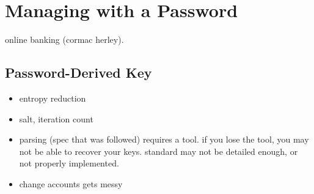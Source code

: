 
\section{Managing with a Password}

\cf online banking (cormac herley).


\subsection{Password-Derived Key} 

\begin{itemize}
  \item entropy reduction
  \item salt, iteration count
  \item parsing (spec that was followed) requires a tool. if you lose the tool, you may not be able to recover your keys. standard may not be detailed enough, or not properly implemented.
  \item change accounts gets messy
\end{itemize}


